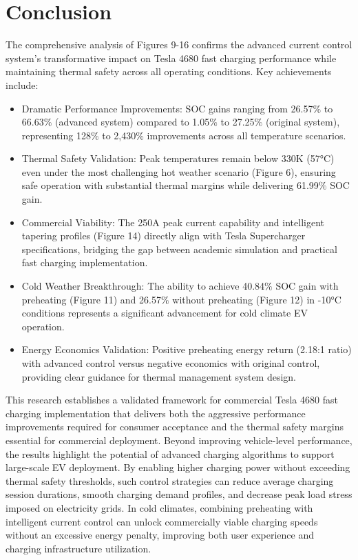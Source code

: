 \documentclass[conference]{IEEEtran}
\begin{document}
\section{Conclusion}
The comprehensive analysis of Figures 9-16 confirms the advanced current control system's transformative impact on Tesla 4680 fast charging performance while maintaining thermal safety across all operating conditions. Key achievements include:
\begin{itemize}
    \item Dramatic Performance Improvements: SOC gains ranging from 26.57$\%$ to 66.63$\%$ (advanced system) compared to 1.05$\%$ to 27.25$\%$ (original system), representing 128$\%$ to 2,430$\%$ improvements across all temperature scenarios.
    \item Thermal Safety Validation: Peak temperatures remain below 330K (57°C) even under the most challenging hot weather scenario (Figure 6), ensuring safe operation with substantial thermal margins while delivering 61.99$\%$ SOC gain.
    \item Commercial Viability: The 250A peak current capability and intelligent tapering profiles (Figure 14) directly align with Tesla Supercharger specifications, bridging the gap between academic simulation and practical fast charging implementation.
    \item Cold Weather Breakthrough: The ability to achieve 40.84$\%$ SOC gain with preheating (Figure 11) and 26.57$\%$ without preheating (Figure 12) in -10°C conditions represents a significant advancement for cold climate EV operation.
    \item Energy Economics Validation: Positive preheating energy return (2.18:1 ratio) with advanced control versus negative economics with original control, providing clear guidance for thermal management system design.
\end{itemize}

This research establishes a validated framework for commercial Tesla 4680 fast charging implementation that delivers both the aggressive performance improvements required for consumer acceptance and the thermal safety margins essential for commercial deployment. Beyond improving vehicle-level performance, the results highlight the potential of advanced charging algorithms to support large-scale EV deployment. By enabling higher charging power without exceeding thermal safety thresholds, such control strategies can reduce average charging session durations, smooth charging demand profiles, and decrease peak load stress imposed on electricity grids. In cold climates, combining preheating with intelligent current control can unlock commercially viable charging speeds without an excessive energy penalty, improving both user experience and charging infrastructure utilization.
\end{document}
